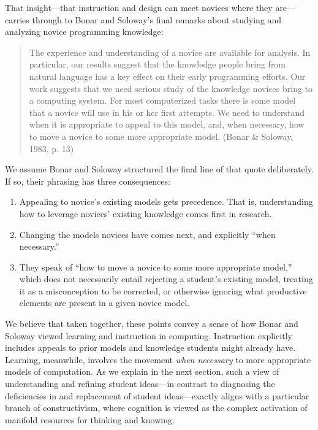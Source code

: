 That insight---that instruction and design can meet novices where they
are---carries through to Bonar and Soloway's final remarks about studying and
analyzing novice programming knowledge:

\begin{quote}
  The experience and understanding of a novice are available for analysis.
  In particular, our results suggest that the knowledge people bring from
  natural language has a key effect on their early programming efforts.
  Our work suggests that we need serious study of the knowledge novices
  bring to a computing system. For most computerized tasks there is some
  model that a novice will use in his or her first attempts. We need to
  understand when it is appropriate to appeal to this model, and, when
  necessary, how to move a novice to some more appropriate model. (Bonar
  \& Soloway, 1983, p. 13)
\end{quote}

We assume Bonar and Soloway structured the final line of that quote deliberately. If
so, their phrasing has three consequences:

\begin{enumerate}
\def\labelenumi{\arabic{enumi}.}
\tightlist
\item
  Appealing to novice's existing models gets precedence. That is,
  understanding how to leverage novices' existing knowledge comes first
  in research.
\item
  Changing the models novices have comes next, and explicitly ``when necessary.''
\item
  They speak of ``how to move a novice to some more appropriate model,''
  which does not necessarily entail rejecting a student's existing model, treating it as a misconception to be corrected, or otherwise ignoring what productive elements are present in a given novice model.
\end{enumerate}

We believe that taken together, these points convey a sense of how Bonar and Soloway \cite{bonar_uncovering_1983}
viewed learning and instruction in computing. Instruction explicitly
includes appeals to prior models and knowledge students might already
have. Learning, meanwhile, involves the movement \emph{when necessary}
to more appropriate models of computation. As we explain in the next
section, such a view of understanding and refining student ideas---in contrast to diagnosing the deficiencies in and replacement of student ideas---exactly aligns with a particular branch of
constructivism, where cognition is viewed as the complex activation of
manifold resources for thinking and knowing.

